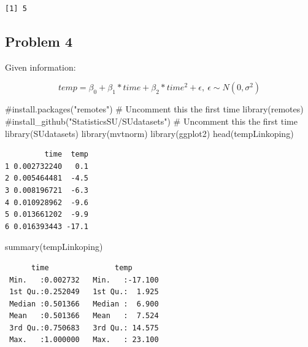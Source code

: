 \documentclass[
  letterpaper,
  DIV=11,
  numbers=noendperiod]{scrartcl}
\newenvironment{Shaded}{\begin{snugshade}}{\end{snugshade}}
\newcommand{\CommentTok}[1]{\textcolor[rgb]{0.37,0.37,0.37}{#1}}
\newcommand{\FunctionTok}[1]{\textcolor[rgb]{0.28,0.35,0.67}{#1}}
\newcommand{\NormalTok}[1]{\textcolor[rgb]{0.00,0.23,0.31}{#1}}
\newcommand{\SpecialCharTok}[1]{\textcolor[rgb]{0.37,0.37,0.37}{#1}}
\newcommand{\StringTok}[1]{\textcolor[rgb]{0.13,0.47,0.30}{#1}}
\begin{document}
\begin{verbatim}
[1] 5
\end{verbatim}

\subsection{Problem 4}\label{problem-4}

Given information:

\[
temp = \beta_0 + \beta_1*time + \beta_2*time^2 + \epsilon, \ \epsilon\sim N(0, \sigma^2)
\]

\begin{Shaded}
\begin{Highlighting}[]
\CommentTok{\#install.packages("remotes")              \# Uncomment this the first time}
\FunctionTok{library}\NormalTok{(remotes)}
\CommentTok{\#install\_github("StatisticsSU/SUdatasets")  \# Uncomment this the first time}
\FunctionTok{library}\NormalTok{(SUdatasets)}
\FunctionTok{library}\NormalTok{(mvtnorm)}
\FunctionTok{library}\NormalTok{(ggplot2)}
\FunctionTok{head}\NormalTok{(tempLinkoping)}
\end{Highlighting}
\end{Shaded}

\begin{verbatim}
         time  temp
1 0.002732240   0.1
2 0.005464481  -4.5
3 0.008196721  -6.3
4 0.010928962  -9.6
5 0.013661202  -9.9
6 0.016393443 -17.1
\end{verbatim}

\begin{Shaded}
\begin{Highlighting}[]
\FunctionTok{summary}\NormalTok{(tempLinkoping)}
\end{Highlighting}
\end{Shaded}

\begin{verbatim}
      time               temp        
 Min.   :0.002732   Min.   :-17.100  
 1st Qu.:0.252049   1st Qu.:  1.925  
 Median :0.501366   Median :  6.900  
 Mean   :0.501366   Mean   :  7.524  
 3rd Qu.:0.750683   3rd Qu.: 14.575  
 Max.   :1.000000   Max.   : 23.100  
\end{verbatim}

\begin{Shaded}
\end{Shaded}
\end{document}
